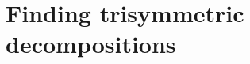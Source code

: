 \documentclass[11pt]{article}
\begin{document}

\section{Finding trisymmetric decompositions}
\label{sec:algos}
\end{document}
